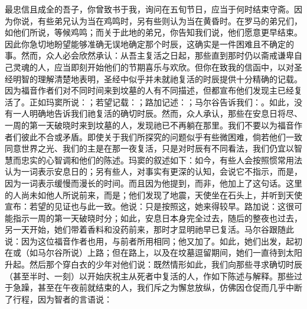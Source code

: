 最忠信且成全的吾子，你曾致书于我，询问在五旬节日，应当于何时结束守斋。因为你说，有些弟兄认为当在鸡鸣时，另有些则认为当在黄昏时。在罗马的弟兄们，如他们所说，等候鸡鸣；而关于此地的弟兄，你告知我们说，他们愿意更早结束。因此你急切地盼望能够准确无误地确定那个时辰，这确实是一件困难且不确定的事。然而，众人必会欣然承认：从吾主复活之日起，那些直到那时仍以斋戒谦卑自己灵魂的人，应当即刻开始他们的节期喜乐与欢欣。但你在致我的信函中，以对圣经明智的理解清楚地表明，圣经中似乎并未就祂复活的时辰提供十分精确的记载。因为福音作者们对不同时间来到坟墓的人有不同描述，但都宣布他们发现主已经复活了。正如玛窦所说：；若望记载：；路加记述：；马尔谷告诉我们：。如此，没有一人明确地告诉我们祂复活的确切时辰。然而，众人承认，那些在安息日将尽、一周的第一天破晓时来到坟墓的人，发现祂已不再躺在那里。我们不要以为福音作者们彼此不合或矛盾。即使关于我们所探究的问题似乎有些微困难，倘若他们一致同意世界之光、我们的主是在那一夜复活，只是对时辰有不同看法，我们仍宜以智慧而忠实的心智调和他们的陈述。玛窦的叙述如下：如今，有些人会按照惯常用法认为一词表示安息日的；另有些人，对事实有更深的认知，会说它不指示，而是，因为一词表示缓慢而漫长的时间。而且因为他提到，而非，他加上了这句话。这里的人尚未如他人所说前来，而是；他们发现了地震，天使坐在石头上，并听到天使宣布：若望的见证也与此一致。他说：只是按照这，她来得较早。路加说：这很可能指示一周的第一天破晓时分；如此，安息日本身完全过去，随后的整夜也过去，另一天开始，她们带着香料和没药前来，那时才显明祂早已复活。马尔谷跟随此说：因为这位福音作者也用，与前者所用相同；他又加了。如此，她们出发，起初在或（如马尔谷所说）上路；但在路上，以及在坟墓逗留期间，她们一直待到太阳升起。然后那个穿白衣的少年对他们说：既然情形如此，我们向那些寻求确切时辰（甚至半时、一刻）以开始庆祝主从死者中复活的人，作如下陈述与解释。那些过于急躁，甚至在午夜前就结束的人，我们斥之为懈怠放纵，仿佛因仓促而几乎中断了行程，因为智者的言语说：\Qu